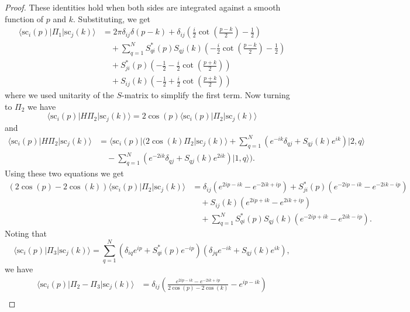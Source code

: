 \documentclass[../thesis-main/thesis-main]{subfiles}
\begin{document}
\begin{proof}
These identities hold when both sides are integrated against a smooth function of $p$ and $k$. Substituting, we get
\begin{align}
\langle\mathrm{sc}_{i}(p)|\Pi_{1}|\mathrm{sc}_{j}(k)\rangle & =  2\pi\delta_{ij}\delta(p-k)+\delta_{ij}\left(\frac{i}{2}\cot\left(\frac{p-k}{2}\right)-\frac{1}{2}\right)\nonumber\\
&\quad+\sum_{q=1}^{N}S_{qi}^{\ast}(p)S_{qj}(k)\left(-\frac{i}{2}\cot\left(\frac{p-k}{2}\right)-\frac{1}{2}\right)\nonumber \\
 &\quad+S_{ji}^{\ast}(p)\left(-\frac{1}{2}-\frac{i}{2}\cot\left(\frac{p+k}{2}\right)\right)\nonumber\\
&\quad+S_{ij}(k)\left(-\frac{1}{2}+\frac{i}{2}\cot\left(\frac{p+k}{2}\right)\right)\label{eq:pi1}
\end{align}
where we used unitarity of the $S$-matrix to simplify the first term.
Now turning to $\Pi_{2}$ we have \begin{equation}
\langle\mathrm{sc}_{i}(p)|H\Pi_{2}|\mathrm{sc}_{j}(k)\rangle=2\cos(p)\langle\mathrm{sc}_{i}(p)|\Pi_{2}|\mathrm{sc}_{j}(k)\rangle\end{equation}
 and 
\begin{align*}
\langle\mathrm{sc}_{i}(p)|H\Pi_{2}|\mathrm{sc}_{j}(k)\rangle & = \langle\mathrm{sc}_{i}(p)|\bigg(2\cos(k)\Pi_{2}|\mathrm{sc}_{j}(k)\rangle+\sum_{q=1}^{N}(e^{-ik}\delta_{qj}+S_{qj}(k)e^{ik})|2,q\rangle\\
&\quad -\sum_{q=1}^{N}(e^{-2ik}\delta_{qj}+S_{qj}(k)e^{2ik})|1,q\rangle\bigg).
\end{align*}
 Using these two equations we get 
\begin{align*}
(2\cos(p)-2\cos(k))\langle\mathrm{sc}_{i}(p)|\Pi_{2}|\mathrm{sc}_{j}(k)\rangle & =  \delta_{ij} (e^{2ip-ik}-e^{-2ik+ip})+S_{ji}^{\ast}(p)(e^{-2ip-ik}-e^{-2ik-ip})\\
 & \quad +S_{ij}(k)(e^{2ip+ik}-e^{2ik+ip})\\
& \quad +\sum_{q=1}^{N}S_{qi}^{\ast}(p)S_{qj}(k)(e^{-2ip+ik}-e^{2ik-ip}).
\end{align*}
 Noting that
\begin{equation}
\langle\mathrm{sc}_{i}(p)|\Pi_{3}|\mathrm{sc}_{j}(k)\rangle=\sum_{q=1}^{N}(\delta_{iq}e^{ip}+S_{qi}^{\ast}(p)e^{-ip})(\delta_{jq}e^{-ik}+S_{qj}(k)e^{ik}),
\end{equation}
we have 
\begin{align}
\langle\mathrm{sc}_{i}(p)|\Pi_{2}-\Pi_{3}|\mathrm{sc}_{j}(k)\rangle & = \delta_{ij}\left(\frac{e^{2ip-ik}-e^{-2ik+ip}}{2\cos(p)-2\cos(k)}-e^{ip-ik}\right)\nonumber\\

\end{align}
\end{proof}
\end{document}
